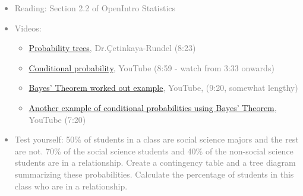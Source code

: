 \documentclass[11pt]{article}
\newcommand{\gray}[1]{\textcolor{gray}{#1}}
\begin{document}
\gray{
{\it
\vspace{-0.75cm}
\begin{itemize}
\renewcommand{\labelitemi}{{\textcolor{dark}{$\ast$}}}
\item Reading: Section 2.2 of OpenIntro Statistics
\item Videos:
\begin{itemize}
\item \href{http://www.youtube.com/watch?v=HxEz4ZHUY5Y}{Probability trees}, Dr.\c{C}etinkaya-Rundel (8:23)
\item \href{http://www.youtube.com/watch?feature=endscreen&NR=1&v=cwADSMeiIoE}{Conditional probability}, YouTube (8:59 - watch from 3:33 onwards)
\item \href{http://www.youtube.com/watch?v=2Df1sDAyRvQ}{Bayes' Theorem worked out example}, YouTube, (9:20, somewhat lengthy) 
\item \href{http://www.youtube.com/watch?v=E2pOJwSwWDk}{Another example of conditional probabilities using Bayes' Theorem}, YouTube (7:20)
\end{itemize}
\item Test yourself: 50\% of students in a class are social science majors and the rest are not. 70\% of the social science students and 40\% of the non-social science students are in a relationship. Create a contingency table and a tree diagram summarizing these probabilities. Calculate the percentage of students in this class who are in a relationship.
\end{itemize}
}}
\end{document}
